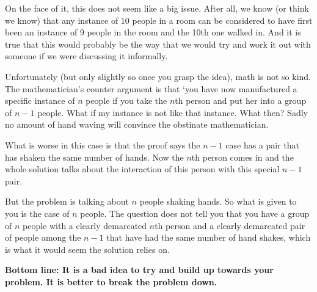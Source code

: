 \documentclass[12pt]{article}
\begin{document}
On the face of it, this does not seem like a big issue. After all, we know (or think we know) that any instance of 10 people in a room can be considered to have first been an instance of 9 people in the room and the 10th one walked in. And it is true that this would probably be the way that we would try and work it out with someone if we were discussing it informally.

Unfortunately (but only slightly so once you grasp the idea), math is not so kind. The mathematician's counter argument is that `you have now manufactured a specific instance of $n$ people if you take the $n$th person and put her into a group of $n-1$ people. What if my instance is not like that instance. What then? Sadly no amount of hand waving will convince the obstinate mathematician. 

What is worse in this case is that the proof says the $n-1$ case has a pair that has shaken the same number of hands. Now the $n$th person comes in and the whole solution talks about the interaction of this person with this special $n-1$ pair. 

But the problem is talking about $n$ people shaking hands. So what is given to you is the case of $n$ people. The question does not tell you that you have a group of $n$ people with a clearly demarcated $n$th person and a clearly demarcated pair of people among the $n-1$ that have had the same number of hand shakes, which is what it would seem the solution relies on.

\textbf {Bottom line: It is a bad idea to try and build up towards your problem. It is better to break the problem down.}
\end{document}
